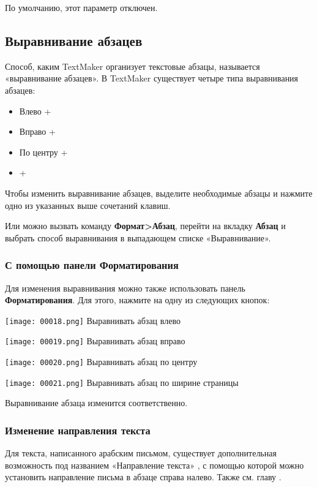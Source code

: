 ﻿\documentclass[a4paper,10pt]{article}
\begin{document}
 По умолчанию, этот параметр отключен.
 
 \subsection{Выравнивание абзацев}
 Способ, каким TextMaker организует текстовые абзацы, называется «выравнивание абзацев». В TextMaker существует четыре типа выравнивания абзацев:
 \begin{itemize}
  \item Влево +
  \item Вправо +
  \item По центру +
  \item {}+
 \end{itemize}

Чтобы изменить выравнивание абзацев, выделите необходимые абзацы и нажмите одно из указанных выше сочетаний клавиш.

Или можно вызвать команду \textbf{Формат>Абзац}, перейти на вкладку \textbf{Абзац} и выбрать способ выравнивания в выпадающем списке «Выравнивание».

\subsubsection{С помощью панели Форматирования}
Для изменения выравнивания можно также использовать панель \textbf{Форматирования}. Для этого, нажмите на одну из следующих кнопок:

\texttt{[image: 00018.png]} Выравнивать абзац влево

\texttt{[image: 00019.png]} Выравнивать абзац вправо

\texttt{[image: 00020.png]} Выравнивать абзац по центру

\texttt{[image: 00021.png]} Выравнивать абзац по ширине страницы

Выравнивание абзаца изменится соответственно.

\subsubsection{Изменение направления текста}

Для текста, написанного арабским письмом, существует дополнительная возможность под названием «Направление текста» , с помощью которой можно установить направление письма в абзаце справа налево. Также см. главу .
\end{document}
